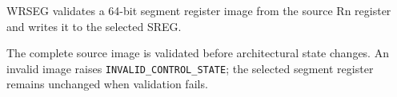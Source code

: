 WRSEG validates a 64-bit segment register image from the source Rn register and writes it to the selected SREG.

The complete source image is validated before architectural state changes. An invalid image raises
\texttt{INVALID\_CONTROL\_STATE}; the selected segment register remains unchanged when validation fails.
